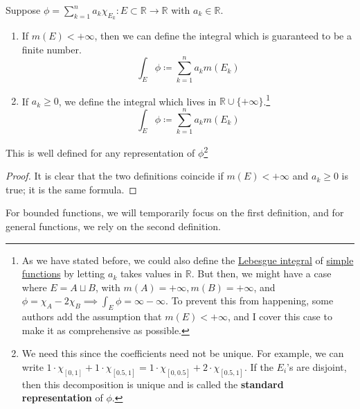   \begin{definition}
    \label{def:lebesgue-integral-for-simple-functions}
    Suppose $\phi = \sum_{k=1}^n a_k \chi_{E_k}: E \subset \mathbb{R} \to \mathbb{R}$ with $a_k \in \mathbb{R}$. 
    \begin{enumerate}
      \item If $m(E) < +\infty$, then we can define the integral which is guaranteed to be a finite number.  
      \begin{equation}
        \int_E \phi \coloneqq \sum_{k=1}^n a_k m(E_k)
      \end{equation} 

      \item If $a_k \geq 0$, we define the integral which lives in $\mathbb{R} \cup \{+\infty\}$.\footnote{As we have stated before, we could also define the \hyperref[def:leb-int-signed]{Lebesgue integral} of \hyperref[def:simple-functions]{simple functions} by letting $a_k$ takes values in $\mathbb{R}$. But then, we might have a case where $E = A \sqcup B$, with $m(A) = +\infty, m(B) = +\infty$, and $\phi = \chi_{A} - 2 \chi_{B} \implies \int_E \phi = \infty - \infty$. To prevent this from happening, some authors add the assumption that $m(E) < +\infty$, and I cover this case to make it as comprehensive as possible. }
      \begin{equation}
        \int_E \phi \coloneqq \sum_{k=1}^n a_k m(E_k)
      \end{equation} 
    \end{enumerate}
    This is well defined for any representation of $\phi$\footnote{We need this since the coefficients need not be unique. For example, we can write $1 \cdot \chi_{[0, 1]} + 1 \cdot \chi_{[0.5, 1]} = 1 \cdot \chi_{[0, 0.5]} + 2 \cdot \chi_{[0.5, 1]}$. If the $E_i$'s are disjoint, then this decomposition is unique and is called the \textbf{standard representation} of $\phi$. } 
  \end{definition} 
  \begin{proof}
    It is clear that the two definitions coincide if $m(E) < +\infty$ and $a_k \geq 0$ is true; it is the same formula.  
  \end{proof} 

  For bounded functions, we will temporarily focus on the first definition, and for general functions, we rely on the second definition. 

